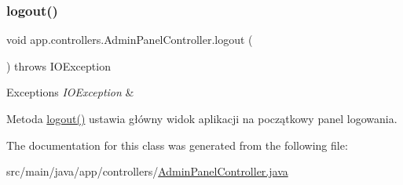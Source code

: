 \subsubsection{\texorpdfstring{logout()}{logout()}}
{\footnotesize\ttfamily void app.\+controllers.\+Admin\+Panel\+Controller.\+logout (\begin{DoxyParamCaption}{ }\end{DoxyParamCaption}) throws I\+O\+Exception}


\begin{DoxyExceptions}{Exceptions}
{\em I\+O\+Exception} & \\
\hline
\end{DoxyExceptions}
Metoda \mbox{\hyperlink{classapp_1_1controllers_1_1_admin_panel_controller_a3634b75893105486fe5c2e7261bdf646}{logout()}} ustawia główny widok aplikacji na początkowy panel logowania. 

The documentation for this class was generated from the following file\+:\begin{DoxyCompactItemize}
\item 
src/main/java/app/controllers/\mbox{\hyperlink{_admin_panel_controller_8java}{Admin\+Panel\+Controller.\+java}}\end{DoxyCompactItemize}
